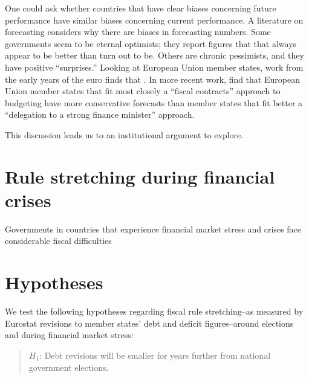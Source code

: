 \documentclass[]{article}
\begin{document}
One could ask whether countries that have clear biases concerning future performance have similar biases concerning current performance. A literature on forecasting considers why there are biases in forecasting numbers. Some governments seem to be eternal optimists; they report figures that that always appear to be better than turn out to be. Others are chronic pessimists, and they have positive “surprises.” Looking at European Union member states, work from the early years of the euro finds that \citep{hallerbergstrauch2002}. In more recent work, \cite{hallerbergstrauch209} find that European Union member states that fit most closely a ``fiscal contracts'' approach to budgeting have more conservative forecasts than member states that fit better a ``delegation to a strong finance minister'' approach.

This discussion leads us to an institutional argument to explore. 

\cite{DeCastro2013} 

\section{Rule stretching during financial crises}

Governments in countries that experience financial market stress and crises face considerable fiscal difficulties

\cite{GandrudHallerberg2016}

\section{Hypotheses}

We test the following hypotheses regarding fiscal rule stretching--as measured by Eurostat revisions to member states' debt and deficit figures--around elections and during financial market stress:

\begin{quote}
    $H_{1}$: Debt revisions will be smaller for years further from national government elections.
\end{quote}
\end{document}
